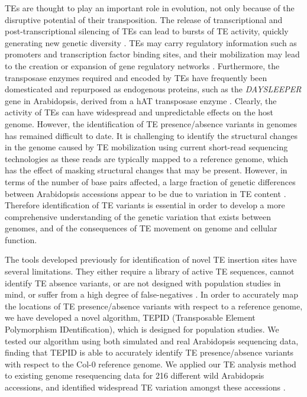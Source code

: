 \documentclass[12pt]{article}
\begin{document}
TEs are thought to play an important role in evolution, not only because
of the disruptive potential of their transposition. The release of
transcriptional and post-transcriptional silencing of TEs can lead to
bursts of TE activity, quickly generating new genetic diversity
\cite{Vitte:2014he}. TEs may carry regulatory information such as
promoters and transcription factor binding sites, and their mobilization
may lead to the creation or expansion of gene regulatory networks
\cite{Henaff:2014hg, Bolger:2014bn, Ito:2011dga, Makarevitch:2015ho}.
Furthermore, the transposase enzymes required and encoded by TEs have
frequently been domesticated and repurposed as endogenous proteins, such
as the \emph{DAYSLEEPER} gene in Arabidopsis, derived from a hAT
transposase enzyme \cite{Bundock:2005gp}. Clearly, the activity of TEs
can have widespread and unpredictable effects on the host genome.
However, the identification of TE presence/absence variants in genomes
has remained difficult to date. It is challenging to identify the
structural changes in the genome caused by TE mobilization using current
short-read sequencing technologies as these reads are typically mapped
to a reference genome, which has the effect of masking structural
changes that may be present. However, in terms of the number of base
pairs affected, a large fraction of genetic differences between
Arabidopsis accessions appear to be due to variation in TE content
\cite{Cao:2011cf, Quadrana:2016bi}. Therefore identification of TE
variants is essential in order to develop a more comprehensive
understanding of the genetic variation that exists between genomes, and
of the consequences of TE movement on genome and cellular function.

The tools developed previously for identification of novel TE insertion
sites have several limitations. They either require a library of active
TE sequences, cannot identify TE absence variants, or are not designed
with population studies in mind, or suffer from a high degree of
false-negatives
\cite{Thung:2014ir, Robb:2013gw, Henaff:2015dl, Quadrana:2016bi}. In
order to accurately map the locations of TE presence/absence variants
with respect to a reference genome, we have developed a novel algorithm,
TEPID (Transposable Element Polymorphism IDentification), which is
designed for population studies. We tested our algorithm using both
simulated and real Arabidopsis sequencing data, finding that TEPID is
able to accurately identify TE presence/absence variants with respect to
the Col-0 reference genome. We applied our TE analysis method to
existing genome resequencing data for 216 different wild Arabidopsis
accessions, and identified widespread TE variation amongst these
accessions \cite{Schmitz:2013iu}.
\end{document}
